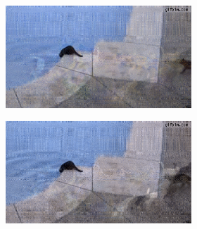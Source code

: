\documentclass[11pt,a4paper]{article}
\begin{document}
\begin{figure}
  \captionsetup[subfigure]{justification=centering}
  \centering
  \def\wid{0.48}
  \def\scal{0.44}
  \begin{subfigure}[]{\wid\textwidth}
    \begin{subfigure}[]{\wid\textwidth}
      \centering
      \includegraphics[keepaspectratio=true, scale=\scal]{Imgs/Cats/frame-10}
    \end{subfigure}
    
    \begin{subfigure}[]{\wid\textwidth}
      \centering
      \includegraphics[keepaspectratio=true, scale=\scal]{Imgs/Cats/frame-11}
    \end{subfigure}
    

\end{subfigure}
\end{figure}
\end{document}
